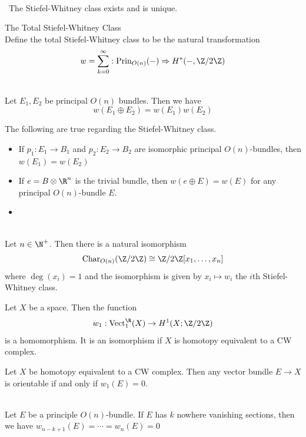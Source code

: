 \documentclass[a4paper]{article}
\begin{document}
\begin{prp}{}{}\\\
The Stiefel-Whitney class exists and is unique. 
\end{prp}

\begin{defn}{The Total Stiefel-Whitney Class}{}\\
Define the total Stiefel-Whitney class to be the natural transformation $$w=\sum_{k=0}^\infty:\text{Prin}_{O(n)}(-)\Rightarrow H^\ast(-,\Z/2\Z)$$
\end{defn}

\begin{lmm}{}{}\\
Let $E_1,E_2$ be principal $O(n)$ bundles. Then we have $$w(E_1\oplus E_2)=w(E_1)w(E_2)$$
\end{lmm}

\begin{prp}{}{} The following are true regarding the Stiefel-Whitney class. 
\begin{itemize}
\item If $p_1:E_1\to B_1$ and $p_2:E_2\to B_2$ are isomorphic principal $O(n)$-bundles, then $w(E_1)=w(E_2)$
\item If $e=B\otimes\R^n$ is the trivial bundle, then $w(e\oplus E)=w(E)$ for any principal $O(n)$-bundle $E$. 
\item 
\end{itemize}
\end{prp}

\begin{prp}{}{}\\
Let $n\in\N^+$. Then there is a natural isomorphism $$\text{Char}_{O(n)}(\Z/2\Z)\cong\Z/2\Z[x_1,\dots,x_n]$$ where $\deg(x_i)=1$ and the isomorphism is given by $x_i\mapsto w_i$ the $i$th Stiefel-Whitney class. 
\end{prp}

\begin{prp}{}{} Let $X$ be a space. Then the function $$w_1:\text{Vect}_1^\R(X)\to H^1(X;\Z/2\Z)$$ is a homomorphism. It is an isomorphism if $X$ is homotopy equivalent to a CW complex. 
\end{prp}

\begin{crl}{}{} Let $X$ be homotopy equivalent to a CW complex. Then any vector bundle $E\to X$ is orientable if and only if $w_1(E)=0$. 
\end{crl}

\begin{prp}{}{}\\
Let $E$ be a principle $O(n)$-bundle. If $E$ has $k$ nowhere vanishing sections, then we have $w_{n-k+1}(E)=\cdots=w_n(E)=0$
\end{prp}
\end{document}
